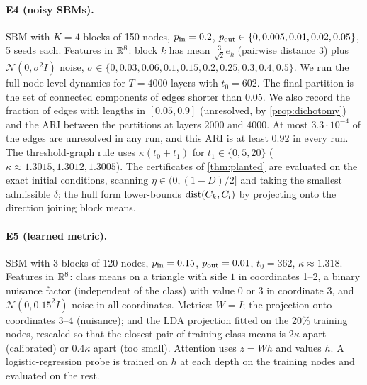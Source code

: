 \paragraph{E4 (noisy SBMs).} SBM with $K=4$ blocks of 150 nodes, $p_{\rm in}=0.2$, $p_{\rm out}\in\{0,0.005,0.01,0.02,0.05\}$, 5 seeds each. Features
in $\mathbb{R}^8$: block $k$ has mean $\frac{3}{\sqrt2}e_k$ (pairwise distance $3$) plus $\mathcal N(0,\sigma^2I)$ noise,
$\sigma\in\{0,0.03,0.06,0.1,0.15,0.2,0.25,0.3,0.4,0.5\}$. We run the full node-level dynamics for $T=4000$ layers with $t_0=602$. The final
partition is the set of connected components of edges shorter than $0.05$. We also record the fraction of edges with lengths in $[0.05,0.9]$
(unresolved, by \cref{prop:dichotomy}) and the ARI between the partitions at layers $2000$ and $4000$. At most $3.3\cdot10^{-4}$ of the edges are unresolved in any run,
and this ARI is at least $0.92$ in every run. The threshold-graph rule uses
$\kappa(t_0+t_1)$ for $t_1\in\{0,5,20\}$ ($\kappa\approx1.3015,1.3012,1.3005$). The certificates of \cref{thm:planted} are evaluated on the exact initial
conditions, scanning $\eta\in(0,(1-D)/2]$ and taking the smallest admissible $\delta$; the hull form lower-bounds $\operatorname{dist}(C_k,C_l)$ by projecting
onto the direction joining block means.

\paragraph{E5 (learned metric).} SBM with 3 blocks of 120 nodes, $p_{\rm in}=0.15$, $p_{\rm out}=0.01$, $t_0=362$, $\kappa\approx1.318$. Features in
$\mathbb{R}^8$: class means on a triangle with side $1$ in coordinates 1--2, a binary nuisance factor (independent of the class) with value $0$ or $3$ in
coordinate 3, and $\mathcal N(0,0.15^2I)$ noise in all coordinates. Metrics: $W=I$; the projection onto coordinates 3--4 (nuisance); and the LDA
projection fitted on the 20\% training nodes, rescaled so that the closest pair of training class means is $2\kappa$ apart (calibrated) or
$0.4\kappa$ apart (too small). Attention uses $z=Wh$ and values $h$. A logistic-regression probe is trained on $h$ at each depth on the training
nodes and evaluated on the rest.

